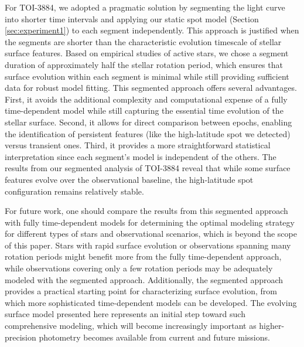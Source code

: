 \documentclass[twocolumn]{aastex631}
\begin{document}
For TOI-3884, we adopted a pragmatic solution by segmenting the light curve into shorter time intervals and applying 
our static spot model (Section \ref{sec:experiment1}) to each segment independently. This approach is justified when 
the segments are shorter than the characteristic evolution timescale of stellar surface features. Based on empirical studies 
of active stars, we chose a segment duration of approximately half the stellar rotation period, 
which ensures that surface evolution within each segment is minimal while still providing sufficient data for robust model fitting.
This segmented approach offers several advantages. First, it avoids the additional complexity and computational expense of a 
fully time-dependent model while still capturing the essential time evolution of the stellar surface. Second, it allows for 
direct comparison between epochs, enabling the identification of persistent features (like the high-latitude spot we detected) 
versus transient ones. Third, it provides a more straightforward statistical interpretation since each segment's model is 
independent of the others.
The results from our segmented analysis of TOI-3884 reveal that while some surface features evolve over the observational 
baseline, the high-latitude spot configuration remains relatively stable. 

For future work, one should compare the results from this segmented approach with fully time-dependent models for determining 
the optimal modeling strategy for different types of stars and observational scenarios, which is beyond the scope of this paper.
Stars with rapid surface evolution or observations spanning many rotation periods might benefit more from the fully 
time-dependent approach, while observations covering only a few rotation periods may be adequately modeled with the 
segmented approach.
Additionally, the segmented approach provides a practical starting point for characterizing surface evolution, 
from which more sophisticated time-dependent models can be developed. The evolving surface model presented 
here represents an initial step toward such comprehensive modeling, which will become increasingly important as 
higher-precision photometry becomes available from current and future missions.
\end{document}
